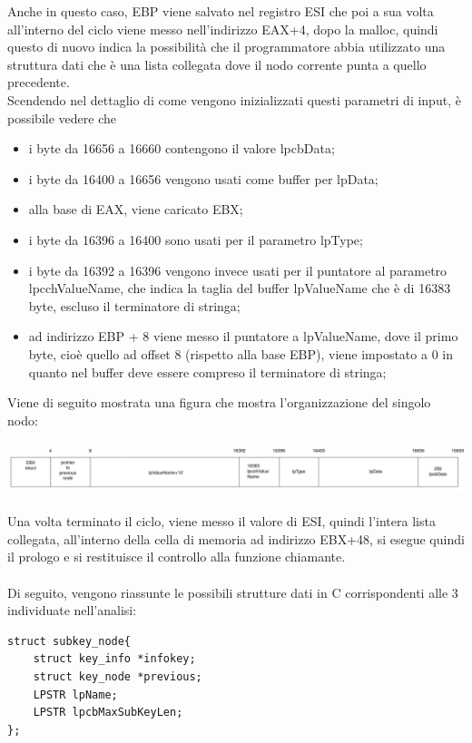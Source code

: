 \documentclass[12pt]{extarticle}
\begin{document}
Anche in questo caso, EBP viene salvato nel registro ESI che poi a sua volta all'interno del ciclo viene messo nell'indirizzo EAX+4, dopo la malloc, quindi questo di nuovo indica la possibilità che il programmatore abbia utilizzato una struttura dati che è una lista collegata dove il nodo corrente punta a quello precedente.\\
Scendendo nel dettaglio di come vengono inizializzati questi parametri di input, è possibile vedere che 
\begin{itemize}
\item i byte da 16656 a 16660 contengono il valore \textsf{lpcbData};
\item i byte da 16400 a 16656 vengono usati come buffer per \textsf{lpData};
\item alla base di EAX, viene caricato EBX;
\item i byte da 16396 a 16400 sono usati per il parametro \textsf{lpType};
\item i byte da 16392 a 16396 vengono invece usati per il puntatore al parametro \textsf{lpcchValueName}, che indica la taglia del buffer \textsf{lpValueName} che è di 16383 byte, escluso il terminatore di stringa;
\item ad indirizzo EBP + 8 viene messo il puntatore a \textsf{lpValueName}, dove il primo byte, cioè quello ad offset 8 (rispetto alla base EBP), viene impostato a 0 in quanto nel buffer deve essere compreso il terminatore di stringa;
\end{itemize}
Viene di seguito mostrata una figura che mostra l'organizzazione del singolo nodo:\\\\
\includegraphics[scale=0.27]{immagini/struct_valori}\\\\
Una volta terminato il ciclo, viene messo il valore di ESI, quindi l'intera lista collegata, all'interno della cella di memoria ad indirizzo EBX+48, si esegue quindi il prologo e si restituisce il controllo alla funzione chiamante.\\\\ Di seguito, vengono riassunte le possibili strutture dati in C corrispondenti alle 3 individuate nell'analisi:\\
\begin{lstlisting}
struct subkey_node{
	struct key_info *infokey;
	struct key_node *previous;	
	LPSTR lpName;
	LPSTR lpcbMaxSubKeyLen;	
};
\end{lstlisting}
\end{document}
